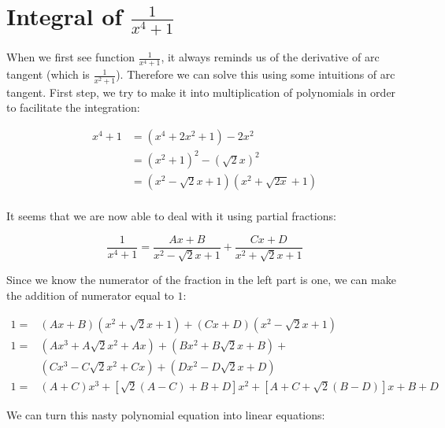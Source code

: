 \section{Integral of $\frac{1}{x^4+1}$}
When we first see function $\frac{1}{x^4+1}$, it always reminds us of the
derivative of arc tangent (which is $\frac{1}{x^2+1}$). Therefore we can solve
this using some intuitions of arc tangent. First step, we try to make it into
multiplication of polynomials in order to facilitate the integration:

$$
\begin{aligned}
	x^4+1
	&=(x^4+2x^2+1)-2x^2 \\
	&=(x^2+1)^2-(\sqrt2x)^2 \\
	&=(x^2-\sqrt2x+1)(x^2+\sqrt{2x}+1) \\
\end{aligned}
$$

It seems that we are now able to deal with it using partial fractions:

$$\frac{1}{x^4+1}=\frac{Ax+B}{x^2-\sqrt2x+1}+\frac{Cx+D}{x^2+\sqrt2x+1}$$

Since we know the numerator of the fraction in the left part is one, we can
make the addition of numerator equal to $1$:

$$
\begin{aligned}
	1=&(Ax+B)(x^2+\sqrt2x+1)+(Cx+D)(x^2-\sqrt2x+1) \\
	1=&(Ax^3+A\sqrt2x^2+Ax)+(Bx^2+B\sqrt2x+B)+ \\
	&(Cx^3-C\sqrt2x^2+Cx)+(Dx^2-D\sqrt2x+D) \\
	1=&(A+C)x^3+[\sqrt2(A-C)+B+D]x^2+[A+C+\sqrt2(B-D)]x+B+D
\end{aligned}
$$

We can turn this nasty polynomial equation into linear equations:

